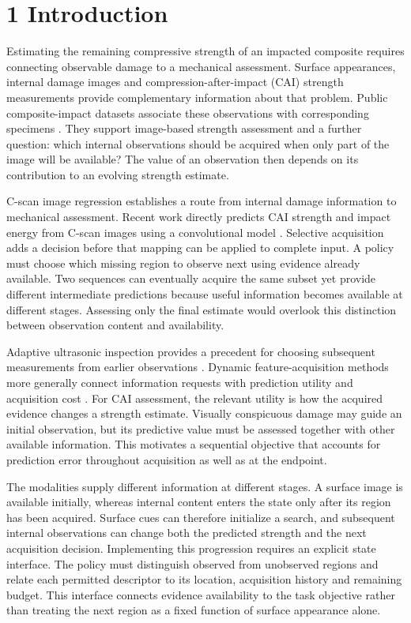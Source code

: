 \section{1 Introduction}\label{introduction}

Estimating the remaining compressive strength of an impacted composite requires connecting observable damage to a mechanical assessment. Surface appearances, internal damage images and compression-after-impact (CAI) strength measurements provide complementary information about that problem. Public composite-impact datasets associate these observations with corresponding specimens \citep{hasebe2022data, hasebe2025data}. They support image-based strength assessment and a further question: which internal observations should be acquired when only part of the image will be available? The value of an observation then depends on its contribution to an evolving strength estimate.

C-scan image regression establishes a route from internal damage information to mechanical assessment. Recent work directly predicts CAI strength and impact energy from C-scan images using a convolutional model \citep{mack2026}. Selective acquisition adds a decision before that mapping can be applied to complete input. A policy must choose which missing region to observe next using evidence already available. Two sequences can eventually acquire the same subset yet provide different intermediate predictions because useful information becomes available at different stages. Assessing only the final estimate would overlook this distinction between observation content and availability.

Adaptive ultrasonic inspection provides a precedent for choosing subsequent measurements from earlier observations \citep{fuentes2020}. Dynamic feature-acquisition methods more generally connect information requests with prediction utility and acquisition cost \citep{shim2018, janisch2019, covert2023}. For CAI assessment, the relevant utility is how the acquired evidence changes a strength estimate. Visually conspicuous damage may guide an initial observation, but its predictive value must be assessed together with other available information. This motivates a sequential objective that accounts for prediction error throughout acquisition as well as at the endpoint.

The modalities supply different information at different stages. A surface image is available initially, whereas internal content enters the state only after its region has been acquired. Surface cues can therefore initialize a search, and subsequent internal observations can change both the predicted strength and the next acquisition decision. Implementing this progression requires an explicit state interface. The policy must distinguish observed from unobserved regions and relate each permitted descriptor to its location, acquisition history and remaining budget. This interface connects evidence availability to the task objective rather than treating the next region as a fixed function of surface appearance alone.

